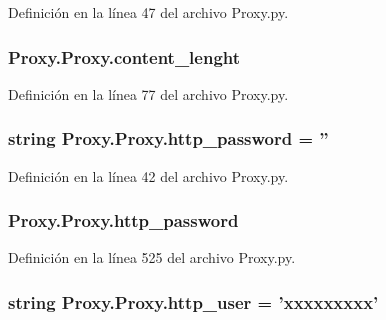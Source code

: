 Definición en la línea 47 del archivo Proxy.\-py.

\hypertarget{class_proxy_1_1_proxy_aa22aa2049c12d112186e97e3e4649686}{
\subsubsection[{content\-\_\-lenght}]{\setlength{\rightskip}{0pt plus 5cm}Proxy.\-Proxy.\-content\-\_\-lenght}}\label{class_proxy_1_1_proxy_aa22aa2049c12d112186e97e3e4649686}


Definición en la línea 77 del archivo Proxy.\-py.

\hypertarget{class_proxy_1_1_proxy_ac1cb73a7484ca9effbfe1f5075906894}{
\subsubsection[{http\-\_\-password}]{\setlength{\rightskip}{0pt plus 5cm}string Proxy.\-Proxy.\-http\-\_\-password = ''\hspace{0.3cm}{\ttfamily [static]}}}\label{class_proxy_1_1_proxy_ac1cb73a7484ca9effbfe1f5075906894}


Definición en la línea 42 del archivo Proxy.\-py.

\hypertarget{class_proxy_1_1_proxy_adc00a281fb7111263639ffb60924877d}{
\subsubsection[{http\-\_\-password}]{\setlength{\rightskip}{0pt plus 5cm}Proxy.\-Proxy.\-http\-\_\-password}}\label{class_proxy_1_1_proxy_adc00a281fb7111263639ffb60924877d}


Definición en la línea 525 del archivo Proxy.\-py.

\hypertarget{class_proxy_1_1_proxy_aafb9a0c764e3e3439045f830cbb7276d}{
\subsubsection[{http\-\_\-user}]{\setlength{\rightskip}{0pt plus 5cm}string Proxy.\-Proxy.\-http\-\_\-user = 'xxxxxxxxx'\hspace{0.3cm}{\ttfamily [static]}}}\label{class_proxy_1_1_proxy_aafb9a0c764e3e3439045f830cbb7276d}


